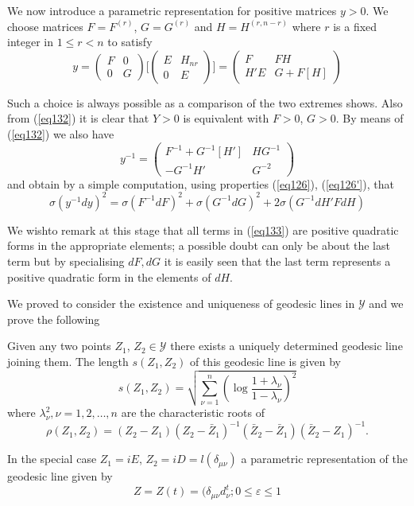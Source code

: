 We now introduce a parametric representation for positive matrices $y
> 0$. We choose matrices $ F = F^{(r)}$, $G = G^{(r)} $ and $H = H^{(r , n -r)}$
where $r$ is a fixed integer in $1 \le r < n$ to satisfy 
\begin{equation*}
y = \begin{pmatrix} F & 0 \\ 0 & G\end{pmatrix} \bigg [ \begin{pmatrix}
      E & H_{n r} \\ 0 & E\end{pmatrix} \bigg] = \begin{pmatrix} F & FH
    \\ H'E & G + F[H]\end{pmatrix} \tag{132}\label{eq132} 
\end{equation*}

Such a choice is always possible as a comparison of the two extremes
shows. Also from (\ref{eq132}) it is clear that $Y > 0$ is equivalent with
$F > 0$, $G > 0$. By means of (\ref{eq132}) we also have  
$$
y^{-1} = \begin{pmatrix} F^{-1 } + G^{-1} [H'] &  HG^{-1} \\ -G^{-1}H'
&  G^{-2} \end{pmatrix} 
$$
and obtain by a simple computation, using properties (\ref{eq126}),
(\ref{eq126'}), that 
\begin{equation*}
\sigma (y^{-1} dy)^2 = \sigma (F^{-1} dF)^2 + \sigma (G^{-1} dG)^2 + 2
\sigma (G^{-1} dH'FdH) \tag{133}\label{eq133} 
\end{equation*}

 We wish\pageoriginale  to remark at this stage that all terms in
 (\ref{eq133}) are 
 positive quadratic forms in the appropriate elements; a possible
 doubt can only be about the last term but by specialising $dF, dG$ it is
 easily seen that the last term represents a positive quadratic form
 in the elements of $d H$. 

We proved to consider the existence and uniqueness of geodesic lines
in $\mathscr{Y}$ and we prove the following 

\setcounter{thm}{7}
\begin{thm}\label{chap7:thm8}%
 Given any two points  $Z_1$, $Z_2 \in \mathscr{Y}$
  there exists a uniquely determined geodesic line joining them. The
  length $s(Z_1 , Z_2)$ of this geodesic line is given by  
\begin{equation*}
s(Z_1 , Z_2) = \sqrt{\sum^n_{\nu =1} (\log \frac{1+
    \lambda_{\nu}}{1 - \lambda_\nu})^2} \tag{134}\label{eq134} 
\end{equation*}
where $\lambda^2_\nu, \nu = 1, 2 , \ldots ,n$ are the characteristic roots
of   
$$
\rho (Z_1 ,Z_2 )=(Z_2 - Z_1) (Z_2 - \bar{Z}_1)^{-1} (\bar{Z}_2 -
\bar{Z}_1) (\bar{Z}_2 - Z_1)^{-1}.  
$$

In the special case $Z_1 = iE$, $Z_2 = i D = l (\delta_{\mu
  \nu})$ a parametric representation of the geodesic line
  given by  
$$
Z = Z(t) = (\delta_{\mu \nu} d^t_\nu ; 0 \le \varepsilon \le 1
$$
\end{thm}

